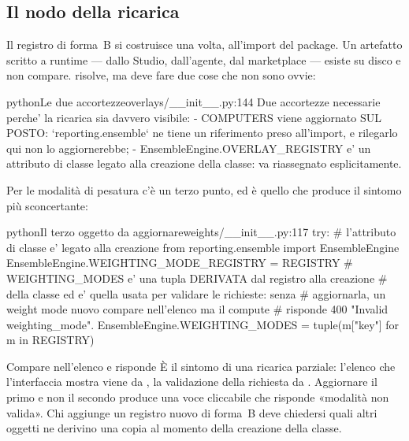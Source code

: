 \subsection{Il nodo della ricarica}

Il registro di forma~B si costruisce una volta, all'import del package. Un
artefatto scritto a runtime --- dallo Studio, dall'agente, dal marketplace ---
esiste su disco e non compare.  risolve, ma deve fare
due cose che non sono ovvie:

\begin{codiceInterno}{python}{Le due accortezze}{overlays/\_\_init\_\_.py:144}
    Due accortezze necessarie perche' la ricarica sia davvero visibile:
    - COMPUTERS viene aggiornato SUL POSTO: `reporting.ensemble` ne tiene un
      riferimento preso all'import, e rilegarlo qui non lo aggiornerebbe;
    - EnsembleEngine.OVERLAY_REGISTRY e' un attributo di classe legato alla
      creazione della classe: va riassegnato esplicitamente.
\end{codiceInterno}

\noindent
Per le modalità di pesatura c'è un terzo punto, ed è quello che produce il
sintomo più sconcertante:

\begin{codiceInterno}{python}{Il terzo oggetto da aggiornare}{weights/\_\_init\_\_.py:117}
    try:                      # l'attributo di classe e' legato alla creazione
        from reporting.ensemble import EnsembleEngine
        EnsembleEngine.WEIGHTING_MODE_REGISTRY = REGISTRY
        # WEIGHTING_MODES e' una tupla DERIVATA dal registro alla creazione
        # della classe ed e' quella usata per validare le richieste: senza
        # aggiornarla, un weight mode nuovo compare nell'elenco ma il compute
        # risponde 400 "Invalid weighting_mode".
        EnsembleEngine.WEIGHTING_MODES = tuple(m["key"] for m in REGISTRY)
\end{codiceInterno}

\begin{attenzione}{Compare nell'elenco e risponde }
È il sintomo di una ricarica parziale: l'elenco che l'interfaccia mostra
viene da , la validazione della richiesta da
. Aggiornare il primo e non il secondo produce una voce
cliccabile che risponde «modalità non valida». Chi aggiunge un registro
nuovo di forma~B deve chiedersi quali altri oggetti ne derivino una copia al
momento della creazione della classe.
\end{attenzione}

